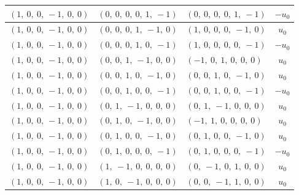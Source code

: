 \documentclass[11pt]{article}
\theoremstyle{definition}
\begin{document}
\begin{longtable}{|l|l|l|c|}
    \hline
    $\left( 1, \  0, \  0, \  -1, \  0, \  0\right)$ & $\left( 0, \  0, \  0, \  0, \  1, \  -1\right)$ & $\left( 0, \  0, \  0, \  0, \  1, \  -1\right)$ & $- u_{0}$ \\
    \hline
    $\left( 1, \  0, \  0, \  -1, \  0, \  0\right)$ & $\left( 0, \  0, \  0, \  1, \  -1, \  0\right)$ & $\left( 1, \  0, \  0, \  0, \  -1, \  0\right)$ & $u_{0}$ \\
    \hline
    $\left( 1, \  0, \  0, \  -1, \  0, \  0\right)$ & $\left( 0, \  0, \  0, \  1, \  0, \  -1\right)$ & $\left( 1, \  0, \  0, \  0, \  0, \  -1\right)$ & $- u_{0}$ \\
    \hline
    $\left( 1, \  0, \  0, \  -1, \  0, \  0\right)$ & $\left( 0, \  0, \  1, \  -1, \  0, \  0\right)$ & $\left( -1, \  0, \  1, \  0, \  0, \  0\right)$ & $u_{0}$ \\
    \hline
    $\left( 1, \  0, \  0, \  -1, \  0, \  0\right)$ & $\left( 0, \  0, \  1, \  0, \  -1, \  0\right)$ & $\left( 0, \  0, \  1, \  0, \  -1, \  0\right)$ & $u_{0}$ \\
    \hline
    $\left( 1, \  0, \  0, \  -1, \  0, \  0\right)$ & $\left( 0, \  0, \  1, \  0, \  0, \  -1\right)$ & $\left( 0, \  0, \  1, \  0, \  0, \  -1\right)$ & $- u_{0}$ \\
    \hline
    $\left( 1, \  0, \  0, \  -1, \  0, \  0\right)$ & $\left( 0, \  1, \  -1, \  0, \  0, \  0\right)$ & $\left( 0, \  1, \  -1, \  0, \  0, \  0\right)$ & $u_{0}$ \\
    \hline
    $\left( 1, \  0, \  0, \  -1, \  0, \  0\right)$ & $\left( 0, \  1, \  0, \  -1, \  0, \  0\right)$ & $\left( -1, \  1, \  0, \  0, \  0, \  0\right)$ & $u_{0}$ \\
    \hline
    $\left( 1, \  0, \  0, \  -1, \  0, \  0\right)$ & $\left( 0, \  1, \  0, \  0, \  -1, \  0\right)$ & $\left( 0, \  1, \  0, \  0, \  -1, \  0\right)$ & $u_{0}$ \\
    \hline
    $\left( 1, \  0, \  0, \  -1, \  0, \  0\right)$ & $\left( 0, \  1, \  0, \  0, \  0, \  -1\right)$ & $\left( 0, \  1, \  0, \  0, \  0, \  -1\right)$ & $- u_{0}$ \\
    \hline
    $\left( 1, \  0, \  0, \  -1, \  0, \  0\right)$ & $\left( 1, \  -1, \  0, \  0, \  0, \  0\right)$ & $\left( 0, \  -1, \  0, \  1, \  0, \  0\right)$ & $u_{0}$ \\
    \hline
    $\left( 1, \  0, \  0, \  -1, \  0, \  0\right)$ & $\left( 1, \  0, \  -1, \  0, \  0, \  0\right)$ & $\left( 0, \  0, \  -1, \  1, \  0, \  0\right)$ & $u_{0}$ \\

\end{longtable}
\end{document}
